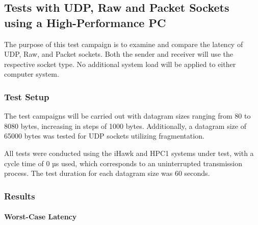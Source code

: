 \subsection{Tests with UDP, Raw and Packet Sockets using a High-Performance PC} \label{chap:PerfSockType}
The purpose of this test campaign is to examine and compare the latency of UDP, Raw, and Packet sockets. Both the sender and receiver will use the respective socket type. No additional system load will be applied to either computer system.

\subsubsection{Test Setup}
The test campaigns will be carried out with datagram sizes ranging from 80 to 8080 bytes, increasing in steps of 1000 bytes. Additionally, a datagram size of 65000 bytes was tested for UDP sockets utilizing fragmentation.

All tests were conducted using the iHawk and HPC1 systems under test, with a cycle time of 0 µs used, which corresponds to an uninterrupted transmission process. The test duration for each datagram size was 60 seconds.

\subsubsection{Results}
\paragraph{Worst-Case Latency}

